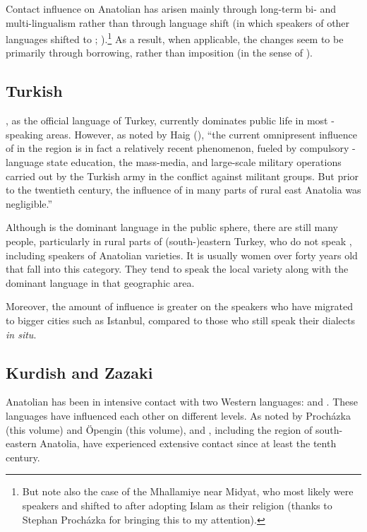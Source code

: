 \documentclass[output=paper]{langsci/langscibook}
\begin{document}
Contact influence on Anatolian  has arisen mainly through long-term bi- and multi-lingualism rather than through {language shift} (in which speakers of other languages shifted to ; \citealt{Thomason2001}).\footnote{But note also the case of the Mhallamiye near Midyat, who most likely were  speakers and shifted to  after adopting Islam as their religion (thanks to Stephan Procházka for bringing this to my attention).} As a result, when applicable, the changes seem to be primarily through borrowing, rather than {imposition} (in the sense of \citealt{VanCoetsem1988,VanCoetsem2000}).


\subsection{Turkish}\largerpage[2]
, as the official language of Turkey, currently dominates public life in most -speaking areas. However, as noted by Haig (\citeyear[14]{Haig2014}), ``the current omnipresent influence of  in the region is in fact a relatively recent phenomenon,
fueled by compulsory -language state education, the mass-media, and large-scale military operations carried out by the Turkish army in the conflict against militant  groups. But prior to the twentieth century, the influence of  in many parts of rural east {Anatolia} was negligible.''

Although  is the dominant language in the public sphere, there are still many people, particularly in rural parts of (south-)eastern Turkey, who do not speak , including speakers of Anatolian  varieties. It is usually women over forty years old that fall into this category. They tend to speak the local  variety along with the dominant language in that geographic area.


Moreover, the amount of  influence is greater on the  speakers who have migrated to bigger cities such as Istanbul, compared to those who still speak their dialects \textit{in situ}.

\subsection{Kurdish and Zazaki}
Anatolian  has been in {intensive} contact with two Western  languages:   and . These languages have influenced each other on different levels. As noted by Proch\'{a}zka (this volume) and Öpengin (this volume),  and , including the region of south-eastern {Anatolia}, have experienced extensive contact since at least the tenth century.
\end{document}
